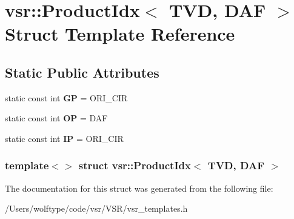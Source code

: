 \hypertarget{structvsr_1_1_product_idx_3_01_t_v_d_00_01_d_a_f_01_4}{\section{vsr\-:\-:Product\-Idx$<$ T\-V\-D, D\-A\-F $>$ Struct Template Reference}
\label{structvsr_1_1_product_idx_3_01_t_v_d_00_01_d_a_f_01_4}
}
\subsection*{Static Public Attributes}
\begin{DoxyCompactItemize}
\item 
\hypertarget{structvsr_1_1_product_idx_3_01_t_v_d_00_01_d_a_f_01_4_a9c0ac7bb698037783d8ee51497665cb0}{static const int {\bfseries G\-P} = O\-R\-I\-\_\-\-C\-I\-R}\label{structvsr_1_1_product_idx_3_01_t_v_d_00_01_d_a_f_01_4_a9c0ac7bb698037783d8ee51497665cb0}

\item 
\hypertarget{structvsr_1_1_product_idx_3_01_t_v_d_00_01_d_a_f_01_4_a39e76de40e31e3b056b36f476583aefe}{static const int {\bfseries O\-P} = D\-A\-F}\label{structvsr_1_1_product_idx_3_01_t_v_d_00_01_d_a_f_01_4_a39e76de40e31e3b056b36f476583aefe}

\item 
\hypertarget{structvsr_1_1_product_idx_3_01_t_v_d_00_01_d_a_f_01_4_abba6476082cfc9be0848c1001e1519bd}{static const int {\bfseries I\-P} = O\-R\-I\-\_\-\-C\-I\-R}\label{structvsr_1_1_product_idx_3_01_t_v_d_00_01_d_a_f_01_4_abba6476082cfc9be0848c1001e1519bd}

\end{DoxyCompactItemize}
\subsubsection*{template$<$$>$ struct vsr\-::\-Product\-Idx$<$ T\-V\-D, D\-A\-F $>$}



The documentation for this struct was generated from the following file\-:\begin{DoxyCompactItemize}
\item 
/\-Users/wolftype/code/vsr/\-V\-S\-R/vsr\-\_\-templates.\-h\end{DoxyCompactItemize}
